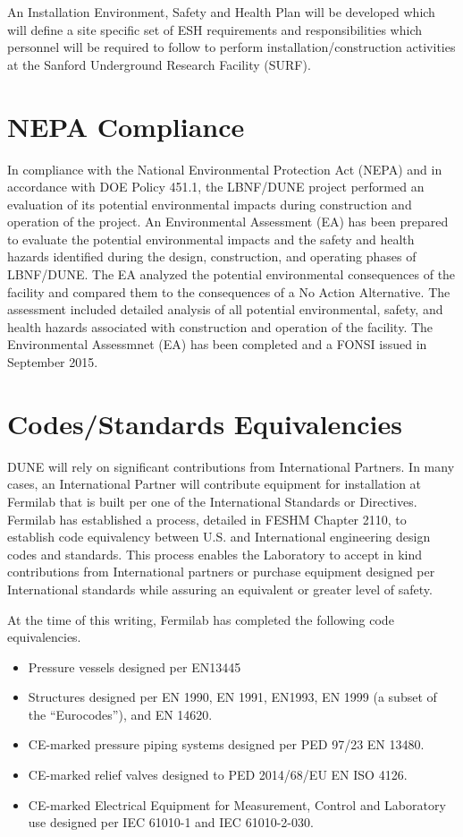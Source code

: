 An Installation Environment, Safety and Health Plan will be developed
which will define a site specific set of ESH requirements and
responsibilities which personnel will be required to follow to perform
installation/construction activities at the Sanford Underground
Research Facility (SURF).

\section{NEPA Compliance}

In compliance with the National Environmental Protection Act (NEPA)
and in accordance with DOE Policy 451.1, the LBNF/DUNE project
performed an evaluation of its potential environmental impacts during
construction and operation of the project.  An Environmental
Assessment (EA) has been prepared to evaluate the potential
environmental impacts and the safety and health hazards identified
during the design, construction, and operating phases of LBNF/DUNE.
The EA analyzed the potential environmental consequences of the
facility and compared them to the consequences of a No Action
Alternative. The assessment included detailed analysis of all
potential environmental, safety, and health hazards associated with
construction and operation of the facility.  The Environmental
Assessmnet (EA) has been completed and a FONSI issued in September
2015.

\section{Codes/Standards Equivalencies}

DUNE will rely on significant contributions from International
Partners. In many cases, an International Partner will contribute
equipment for installation at Fermilab that is built per one of the
International Standards or Directives. Fermilab has established a
process, detailed in FESHM Chapter 2110, to establish code equivalency
between U.S. and International engineering design codes and
standards. This process enables the Laboratory to accept in kind
contributions from International partners or purchase equipment
designed per International standards while assuring an equivalent or
greater level of safety.

At the time of this writing, Fermilab has completed the following code
equivalencies.
\begin{itemize}
 \item Pressure vessels designed per EN13445
 \item Structures designed per EN 1990, EN 1991, EN1993, EN 1999 (a
   subset of the “Eurocodes”), and EN 14620.
 \item CE-marked pressure piping systems designed per PED 97/23 EN 13480.
 \item CE-marked relief valves designed to PED 2014/68/EU EN ISO 4126.
 \item CE-marked Electrical Equipment for Measurement, Control and
   Laboratory use designed per IEC 61010-1 and IEC 61010-2-030.
\end{itemize}

